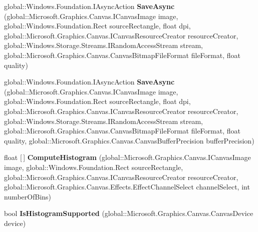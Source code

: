 \begin{DoxyCompactItemize}
global\+::\+Windows.\+Foundation.\+I\+Async\+Action {\bfseries Save\+Async} (global\+::\+Microsoft.\+Graphics.\+Canvas.\+I\+Canvas\+Image image, global\+::\+Windows.\+Foundation.\+Rect source\+Rectangle, float dpi, global\+::\+Microsoft.\+Graphics.\+Canvas.\+I\+Canvas\+Resource\+Creator resource\+Creator, global\+::\+Windows.\+Storage.\+Streams.\+I\+Random\+Access\+Stream stream, global\+::\+Microsoft.\+Graphics.\+Canvas.\+Canvas\+Bitmap\+File\+Format file\+Format, float quality)
\item 
\mbox{\label{interface_microsoft_1_1_graphics_1_1_canvas_1_1_i_canvas_image_statics_a21753a6236cd5f5b4187172eb1f59d72}} 
global\+::\+Windows.\+Foundation.\+I\+Async\+Action {\bfseries Save\+Async} (global\+::\+Microsoft.\+Graphics.\+Canvas.\+I\+Canvas\+Image image, global\+::\+Windows.\+Foundation.\+Rect source\+Rectangle, float dpi, global\+::\+Microsoft.\+Graphics.\+Canvas.\+I\+Canvas\+Resource\+Creator resource\+Creator, global\+::\+Windows.\+Storage.\+Streams.\+I\+Random\+Access\+Stream stream, global\+::\+Microsoft.\+Graphics.\+Canvas.\+Canvas\+Bitmap\+File\+Format file\+Format, float quality, global\+::\+Microsoft.\+Graphics.\+Canvas.\+Canvas\+Buffer\+Precision buffer\+Precision)
\item 
\mbox{\label{interface_microsoft_1_1_graphics_1_1_canvas_1_1_i_canvas_image_statics_a21324f0dd43dd52006fc02fb9aa474d3}} 
float \mbox{[}$\,$\mbox{]} {\bfseries Compute\+Histogram} (global\+::\+Microsoft.\+Graphics.\+Canvas.\+I\+Canvas\+Image image, global\+::\+Windows.\+Foundation.\+Rect source\+Rectangle, global\+::\+Microsoft.\+Graphics.\+Canvas.\+I\+Canvas\+Resource\+Creator resource\+Creator, global\+::\+Microsoft.\+Graphics.\+Canvas.\+Effects.\+Effect\+Channel\+Select channel\+Select, int number\+Of\+Bins)
\item 
\mbox{\label{interface_microsoft_1_1_graphics_1_1_canvas_1_1_i_canvas_image_statics_ae36ced4f89421bf05ceea6e51eb6f95b}} 
bool {\bfseries Is\+Histogram\+Supported} (global\+::\+Microsoft.\+Graphics.\+Canvas.\+Canvas\+Device device)
\item 
\mbox{\label{interface_microsoft_1_1_graphics_1_1_canvas_1_1_i_canvas_image_statics_a24c2e03f2a0d0284e0926c456f6c05cd}} 

\end{DoxyCompactItemize}
